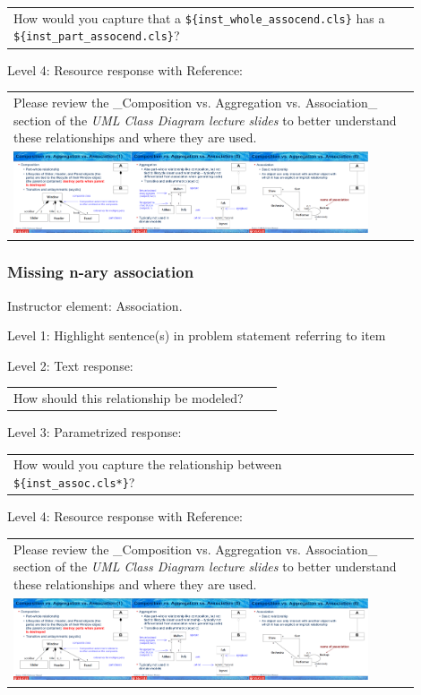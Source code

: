 \begin{tabular}{|p{0.9\linewidth}}
How would you capture that a \verb|${inst_whole_assocend.cls}| has a \verb|${inst_part_assocend.cls}|?
\end{tabular} \medskip

\noindent Level 4: Resource response with Reference: \medskip

\begin{tabular}{|p{0.9\linewidth}}
Please review the _Composition vs. Aggregation vs. Association_ section of 
the \textit{UML Class Diagram lecture slides} to 
better understand these relationships and where they are used.

\\
\includegraphics[width=0.9\textwidth]{images/composition_aggregation_association.png}
\end{tabular} \medskip


\subsubsection{Missing n-ary association}

Instructor element: Association. \medskip

\noindent Level 1: Highlight sentence(s) in problem statement referring to item \medskip

\noindent Level 2: Text response: \medskip

\begin{tabular}{|p{0.9\linewidth}}
How should this relationship be modeled?
\end{tabular} \medskip

\noindent Level 3: Parametrized response: \medskip

\begin{tabular}{|p{0.9\linewidth}}
How would you capture the relationship between \verb|${inst_assoc.cls*}|?
\end{tabular} \medskip

\noindent Level 4: Resource response with Reference: \medskip

\begin{tabular}{|p{0.9\linewidth}}
Please review the _Composition vs. Aggregation vs. Association_ section of 
the \textit{UML Class Diagram lecture slides} to 
better understand these relationships and where they are used.

\\
\includegraphics[width=0.9\textwidth]{images/composition_aggregation_association.png}
\end{tabular} \medskip


